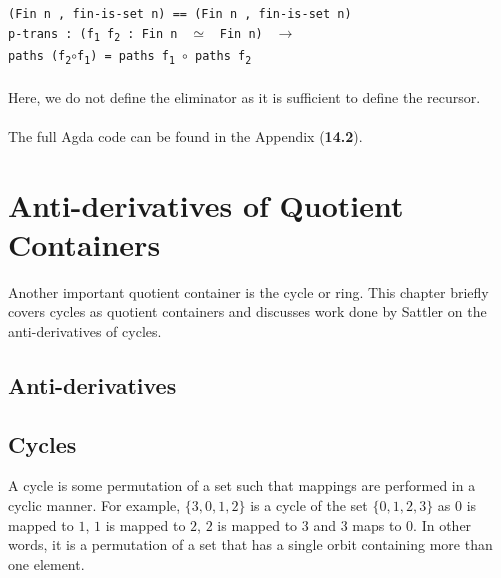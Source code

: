 \documentclass[12pt]{report}
\begin{document}
\-\hspace{4.2cm}\texttt{(Fin n , fin-is-set n) == (Fin n , fin-is-set n)}\\
\-\hspace{3.2cm}\texttt{p-trans : (f\textsubscript{1} f\textsubscript{2} : Fin n } $\simeq$ \texttt{ Fin n) } $\to$\\
\-\hspace{4.2cm} \texttt{paths (f\textsubscript{2}}$\circ$\texttt{f\textsubscript{1}) = paths f\textsubscript{1} }$\circ$\texttt{ paths f\textsubscript{2}}\\
\\
Here, we do not define the eliminator as it is sufficient to define the recursor.\\
\\
The full Agda code can be found in the Appendix (\textbf{14.2}).

\chapter{Anti-derivatives of Quotient Containers}
Another important quotient container is the cycle or ring. This chapter briefly covers cycles as quotient containers and discusses work done by Sattler\cite{cycle} on the anti-derivatives of cycles.
\section{Anti-derivatives}

\section{Cycles}
A cycle is some permutation of a set such that mappings are performed in a cyclic manner. For example, $\{3,0,1,2\}$ is a cycle of the set $\{0,1,2,3\}$ as $0$ is mapped to $1$, $1$ is mapped to $2$, $2$ is mapped to $3$ and $3$ maps to $0$. In other words, it is a permutation of a set that has a single orbit containing more than one element.
\end{document}
